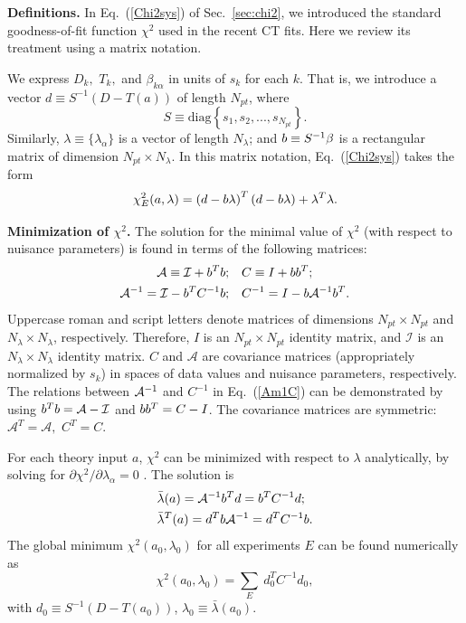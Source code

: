 {\bf Definitions.}
%
In Eq.~(\ref{Chi2sys}) of Sec.~\ref{sec:chi2}, we introduced the standard
goodness-of-fit function $\chi^{2}$ used in the recent CT fits. Here
we review its treatment using a matrix notation.

%
We express $D_{k},$ $T_{k},$ and $\beta_{k\alpha}$
in units of $s_{k}$ for each $k$. That is, we introduce a vector
$d\equiv S^{-1}\left(D-T(a)\right)$ of length $N_{pt}$, where
\begin{equation}
S\equiv\mbox{diag}\left\{ s_{1},s_{2},...,s_{N_{pt}}\right\} .\label{S}
\end{equation}
Similarly, $\lambda\equiv\{\lambda_{\alpha}\}$ is a vector of length
$N_{\lambda}$; and $b\equiv S^{-1}\beta$ is a rectangular matrix
of dimension $N_{pt}\times N_{\lambda}$.
%
In this matrix notation, Eq.~(\ref{Chi2sys}) takes the form
\begin{equation}
\chi_{E}^{2}(a,\lambda)=\left(d-b\lambda\right)^{T}(d-
b\lambda)+\lambda^{T}\lambda.\label{Chi2sys2}
\end{equation}

{\bf Minimization of $\chi^{2}$.}
%
The solution for the minimal value of $\chi^{2}$ (with respect to nuisance parameters) is found in terms
of the following matrices:
\begin{align}
\mathcal{A}\equiv\mathcal{I}+ {b}^{T}b;~~~ & C\equiv I+bb^{T};\label{ACm1}\\
\mathcal{A}^{-1}=\mathcal{I}-b^{T}C^{-1}b;~~~ & C^{-1}=I-b\mathcal{A}^{-1}b^{T}.\label{Am1C}
\end{align}
Uppercase roman and script letters denote matrices of dimensions $N_{pt}\times N_{pt}$
and $N_{\lambda}\times N_{\lambda}$, respectively. Therefore, $I$
is an $N_{pt}\times N_{pt}$ identity matrix, and $\mathcal{I}$ is
an $N_{\lambda}\times N_{\lambda}$ identity matrix. $C$ and $\mathcal{A}$
are covariance matrices (appropriately normalized by $s_{k}$) in
spaces of data values and nuisance parameters, respectively. The relations
between ${\cal A}^{-1}$ and $C^{-1}$ in Eq.~(\ref{Am1C}) can be
demonstrated by using $b^{T}b=\mathcal{A}-\mathcal{I}$ and
$bb^{T}=C-I$. The covariance matrices are symmetric: $\mathcal{A}^{T}=\mathcal{A},$
$C^{T}=C$.

For each theory input $a$, $\chi^{2}$ can be minimized with respect
to $\lambda$ analytically, by solving for $\partial\chi^{2}/\partial\lambda_{\alpha}=0$
\cite{Pumplin:2002vw}. The solution is
\begin{align}
 & \bar{\lambda}(a)=\mathcal{A}^{-1}b^{T}d=b^{T}C^{-1}d;\label{lambda0}\\
 & \bar{\lambda}^{T}(a)=d^{T}b\mathcal{A}^{-1}=d^{T}C^{-1}b.
\end{align}
 The global minimum $\chi^{2}(a_{0},\lambda_{0})$ for all experiments
$E$ can be found numerically as
\begin{equation}
\chi^{2}(a_{0},\lambda_{0})=\sum_{E}\ d_{0}^{T}C^{-1}d_{0},\label{Chi2CovMat}
\end{equation}
 with $d_{0}\equiv S^{-1}\left(D-T(a_{0})\right)$, $\lambda_{0}\equiv\bar{\lambda}(a_{0})$.

